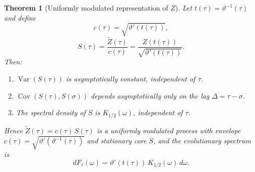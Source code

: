 \documentclass[11pt,a4paper]{article}
\newtheorem{theorem}{Theorem}
\begin{document}
\begin{theorem}[Uniformly modulated representation of $Z$]
\label{thm:main}
Let $t(\tau)=\vartheta^{-1}(\tau)$ and define
\begin{equation}
\label{eq:c}
c(\tau) = \sqrt{\vartheta'(t(\tau))},
\end{equation}
\begin{equation}
\label{eq:S}
S(\tau) = \frac{\widetilde{Z}(\tau)}{c(\tau)}
= \frac{Z(t(\tau))}{\sqrt{\vartheta'(t(\tau))}}.
\end{equation}
Then:
\begin{enumerate}
\item $\operatorname{Var}(S(\tau))$ is asymptotically constant, independent of $\tau$.
\item $\operatorname{Cov}(S(\tau),S(\sigma))$ depends asymptotically only on
the lag $\Delta=\tau-\sigma$.
\item The spectral density of $S$ is $K_{1/2}(\omega)$, independent of $\tau$.
\end{enumerate}
Hence $\widetilde{Z}(\tau)=c(\tau)\,S(\tau)$ is a uniformly modulated process
with envelope $c(\tau)=\sqrt{\vartheta'(\vartheta^{-1}(\tau))}$ and stationary
core $S$, and the evolutionary spectrum is
\begin{equation}
\label{eq:evol-spectrum}
dF_\tau(\omega) = \vartheta'(t(\tau))\,K_{1/2}(\omega)\,d\omega.
\end{equation}
\end{theorem}
\end{document}
